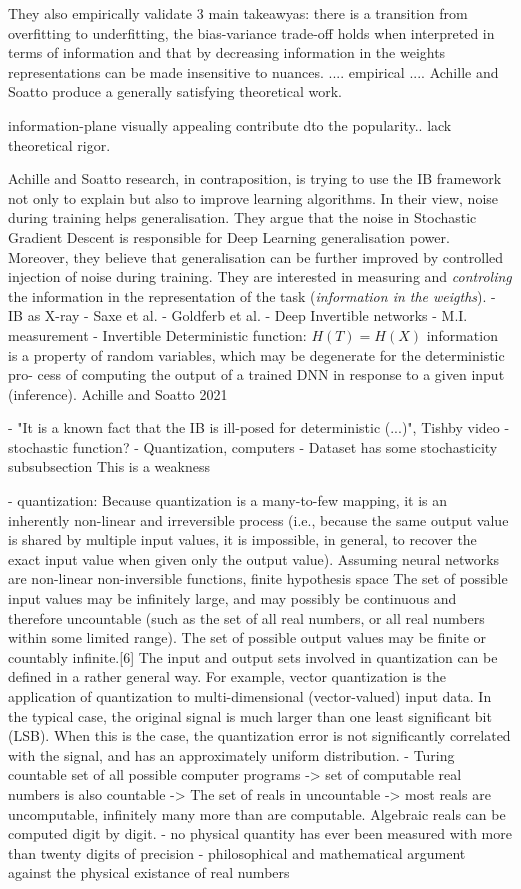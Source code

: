 They also empirically validate 3 main takeawyas: there is a transition from overfitting to underfitting, the bias-variance trade-off holds when interpreted in terms of information and that by decreasing information in the weights representations can be made insensitive to nuances.
.... empirical ....
Achille and Soatto produce a generally satisfying theoretical work.

information-plane visually appealing contribute dto the popularity.. lack theoretical rigor.

Achille and Soatto research, in contraposition, is trying to use the IB framework not only to explain but also to improve learning algorithms.  In their view, noise during training helps generalisation. They argue that the noise in Stochastic Gradient Descent is responsible for Deep Learning generalisation power. Moreover, they believe that generalisation can be further improved by controlled injection of noise during training. They are interested in measuring and \emph{controling} the information in the representation of the task (\emph{information in the weigths}).
- IB as X-ray
		- Saxe et al.
		- Goldferb et al.
		- Deep Invertible networks
		- M.I. measurement
		- Invertible Deterministic function: $H(T)=H(X)$ information is a property of random variables, which may be degenerate for the deterministic pro- cess of computing the output of a trained DNN in response to a given input (inference). Achille and Soatto 2021

		- "It is a known fact that the IB is ill-posed for deterministic (...)", Tishby video
		- stochastic function?
		- Quantization, computers
		- Dataset has some stochasticity
		subsubsection This is a weakness

		- quantization: Because quantization is a many-to-few mapping, it is an inherently non-linear and irreversible process (i.e., because the same output value is shared by multiple input values, it is impossible, in general, to recover the exact input value when given only the output value).
		Assuming neural networks are non-linear non-inversible functions, finite hypothesis space
		The set of possible input values may be infinitely large, and may possibly be continuous and therefore uncountable (such as the set of all real numbers, or all real numbers within some limited range). The set of possible output values may be finite or countably infinite.[6] The input and output sets involved in quantization can be defined in a rather general way. For example, vector quantization is the application of quantization to multi-dimensional (vector-valued) input data. In the typical case, the original signal is much larger than one least significant bit (LSB). When this is the case, the quantization error is not significantly correlated with the signal, and has an approximately uniform distribution.
		- Turing \cite{turing:1936} countable set of all possible computer programs -> set of computable real numbers is also countable -> The set of reals in uncountable -> most reals are uncomputable, infinitely many more than are computable. Algebraic reals can be computed digit by digit.
		- no physical quantity has ever been measured with more than twenty digits of precision\cite[p. 92]{chaitin:2006}
		- philosophical and mathematical argument against the physical existance of real numbers \cite[99-116]{chaitin:2006}

